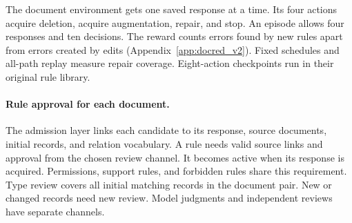 The document environment gets one saved response at a time. Its four
actions acquire deletion, acquire augmentation, repair, and stop.
An episode allows four responses and ten decisions. The reward counts
errors found by new rules apart from errors created by edits
(Appendix~\ref{app:docred_v2}). Fixed schedules and all-path replay measure
repair coverage. Eight-action checkpoints run in their original rule library.

\paragraph{Rule approval for each document.}

The admission layer links each candidate to its response, source documents,
initial records, and relation vocabulary. A rule needs valid source links
and approval from the chosen review channel. It becomes active when its
response is acquired. Permissions, support rules, and forbidden rules share
this requirement. Type review covers all initial matching records in
the document pair. New or changed records need new review.
Model judgments and independent reviews have separate channels.
